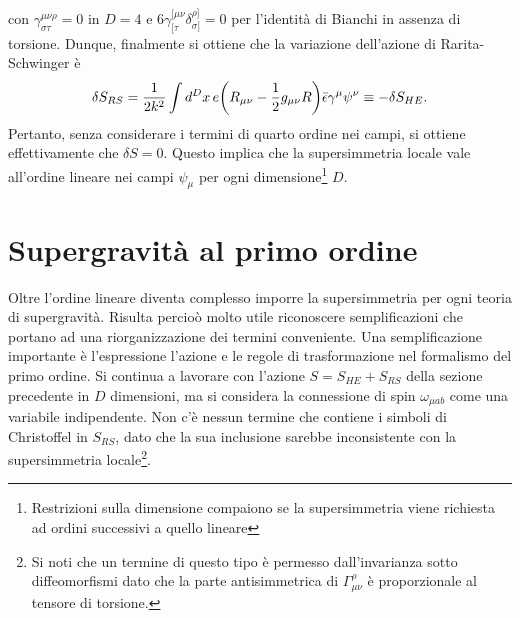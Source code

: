 con $\gamma^{\mu\nu\rho}_{\sigma\tau} = 0$ in $D = 4$ e $6\gamma^{[\mu\nu}_{[\tau}\delta^{\rho]}_{\sigma]} = 0$ per l'identità di Bianchi in assenza di torsione. Dunque, finalmente si ottiene che la variazione dell'azione di Rarita-Schwinger è
\begin{equation}
    \delta S_{RS} = \frac{1}{2k^2}\int d^Dx\,e\bigg(R_{\mu\nu} - \frac{1}{2}g_{\mu\nu}R\bigg)\bar{\epsilon}\gamma^{\mu}\psi^\nu \equiv -\delta S_{HE}.
\end{equation}
Pertanto, senza considerare i termini di quarto ordine nei campi, si ottiene effettivamente che $\delta S = 0$. Questo implica che la supersimmetria locale vale all'ordine lineare nei campi $\psi_\mu$ per ogni dimensione\footnote{Restrizioni sulla dimensione compaiono se la supersimmetria viene richiesta ad ordini successivi a quello lineare} $D$.

\section{Supergravità al primo ordine}
Oltre l'ordine lineare diventa complesso imporre la supersimmetria per ogni teoria di supergravità. Risulta percioò molto utile riconoscere semplificazioni che portano ad una riorganizzazione dei termini conveniente. Una semplificazione importante è l'espressione l'azione e le regole di trasformazione nel formalismo del primo ordine. Si continua a lavorare con l'azione $S = S_{HE} + S_{RS}$ della sezione precedente in $D$ dimensioni, ma si considera la connessione di spin $\omega_{\mu ab}$ come una variabile indipendente. Non c'è nessun termine che contiene i simboli di Christoffel in $S_{RS}$, dato che la sua inclusione sarebbe inconsistente con la supersimmetria locale\footnote{Si noti che un termine di questo tipo è permesso dall'invarianza sotto diffeomorfismi dato che la parte antisimmetrica di $\Gamma^\rho_{\mu\nu}$ è proporzionale al tensore di torsione.}.

